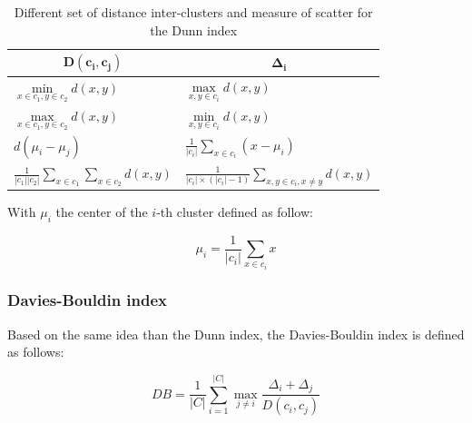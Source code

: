 \documentclass[a4paper]{report}
\begin{document}
    {\setlength{\extrarowheight}{10pt}%
    \begin{table}[h]
    \centering
    \begin{tabular}{ll}
    \multicolumn{1}{c}{$\mathbf{D(c_i, c_j)}$}                   & \multicolumn{1}{c}{$\mathbf{\Delta_i}$}                                   \\ [10pt] \bottomrule
    $\min\limits_{x \in c_1, y \in c_2} d(x, y)$                           & $\max\limits_{x, y \in c_i} d(x,y)$                                                       \\ [10pt] \bottomrule
    $\max\limits_{x \in c_1, y \in c_2} d(x, y)$                           & $\min\limits_{x, y \in c_i} d(x,y)$                                                       \\ [10pt] \bottomrule
    $d(\mu_i - \mu_j)$                                             & $\frac{1}{|c_i|}\sum_{x \in c_i}(x - \mu_i)$                               \\ [10pt] \bottomrule
    $\frac{1}{|c_1||c_2|}\sum\limits_{x \in c_1}\sum\limits_{x \in c_2} d(x, y)$ & $\frac{1}{|c_i| \times (|c_i| - 1)} \sum\limits_{x, y \in c_i, x \neq y} d(x, y)$ \\ [10pt] \bottomrule
    \end{tabular}
    \caption{Different set of distance inter-clusters and measure of scatter for the Dunn index}
\label{tab:all_dunn_index}
    \end{table}}

    \vspace{0.8cm}

    With $\mu_i$ the center of the $i$-th cluster defined as follow:

    \begin{equation}
        \mu_i = \frac{1}{|c_i|}\sum_{x \in c_i}x
        \label{eq:mui}
    \end{equation}

    \subsubsection{Davies-Bouldin index}
    Based on the same idea than the Dunn index, the Davies-Bouldin index is defined as follows:

    \begin{equation}
DB = \frac{1}{|C|}\sum_{i=1}^{|C|} \max_{j \neq i} \frac{\Delta_i + \Delta_j}{D(c_i,c_j)}
        \label{eq:db_index}
    \end{equation}
\end{document}
